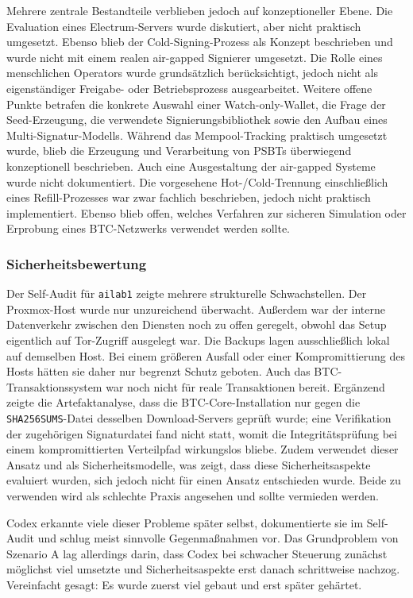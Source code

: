 Mehrere zentrale Bestandteile verblieben jedoch auf konzeptioneller Ebene. Die Evaluation eines Electrum-Servers wurde diskutiert, aber nicht praktisch umgesetzt. Ebenso blieb der Cold-Signing-Prozess als Konzept beschrieben und wurde nicht mit einem realen air-gapped Signierer umgesetzt. 
Die Rolle eines menschlichen Operators wurde grundsätzlich berücksichtigt, jedoch nicht als eigenständiger Freigabe- oder Betriebsprozess ausgearbeitet. Weitere offene Punkte betrafen die konkrete Auswahl einer Watch-only-Wallet, die Frage der Seed-Erzeugung, die verwendete Signierungsbibliothek sowie den Aufbau eines Multi-Signatur-Modells. Während das Mempool-Tracking praktisch umgesetzt wurde, blieb die Erzeugung und Verarbeitung von \acp{PSBT} überwiegend konzeptionell beschrieben. 
Auch eine Ausgestaltung der air-gapped Systeme wurde nicht dokumentiert. Die vorgesehene Hot-/Cold-Trennung einschließlich eines Refill-Prozesses war zwar fachlich beschrieben, jedoch nicht praktisch implementiert. 
Ebenso blieb offen, welches Verfahren zur sicheren Simulation oder Erprobung eines \ac{BTC}-Netzwerks verwendet werden sollte.

\subsubsection{Sicherheitsbewertung}

Der Self-Audit für \texttt{ailab1} zeigte mehrere strukturelle Schwachstellen. Der Proxmox-Host wurde nur unzureichend überwacht. Außerdem war der interne Datenverkehr zwischen den Diensten noch zu offen geregelt, obwohl das Setup eigentlich auf Tor-Zugriff ausgelegt war. Die Backups lagen ausschließlich lokal auf demselben Host. Bei einem größeren Ausfall oder einer Kompromittierung des Hosts hätten sie daher nur begrenzt Schutz geboten. 
Auch das \ac{BTC}-Transaktionssystem war noch nicht für reale Transaktionen bereit. Ergänzend zeigte die Artefaktanalyse, dass die \ac{BTC}-Core-Installation nur gegen die \texttt{SHA256SUMS}-Datei desselben Download-Servers geprüft wurde; eine Verifikation der zugehörigen Signaturdatei fand nicht statt, womit die Integritätsprüfung bei einem kompromittierten Verteilpfad wirkungslos bliebe.
Zudem verwendet dieser Ansatz  und  als Sicherheitsmodelle, was zeigt, dass diese Sicherheitsaspekte evaluiert wurden, sich jedoch nicht für einen Ansatz entschieden wurde. Beide zu verwenden wird als schlechte Praxis angesehen und sollte vermieden werden.

Codex erkannte viele dieser Probleme später selbst, dokumentierte sie im Self-Audit und schlug meist sinnvolle Gegenmaßnahmen vor. Das Grundproblem von Szenario A lag allerdings darin, dass Codex bei schwacher Steuerung zunächst möglichst viel umsetzte und Sicherheitsaspekte erst danach schrittweise nachzog. Vereinfacht gesagt: Es wurde zuerst viel gebaut und erst später gehärtet.

